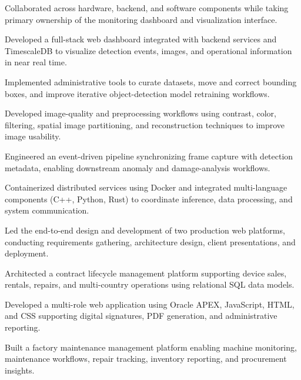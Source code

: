 \documentclass{../../../Styles/MS-Style}
\begin{document}
\begin{Form}
\begin{listBlock}
		\generalItem
		Collaborated across hardware, backend, and software components while taking
		primary ownership of the monitoring dashboard and visualization interface.

		\generalItem
		Developed a full-stack web dashboard integrated with backend services and TimescaleDB
		to visualize detection events, images, and operational information in near real time.

		\generalItem
		Implemented administrative tools to curate datasets, move and correct bounding boxes,
		and improve iterative object-detection model retraining workflows.

		\generalItem
		Developed image-quality and preprocessing workflows using contrast, color, filtering,
		spatial image partitioning, and reconstruction techniques to improve image usability.

		\generalItem
		Engineered an event-driven pipeline synchronizing frame capture with detection metadata,
		enabling downstream anomaly and damage-analysis workflows.

		\generalItem
		Containerized distributed services using Docker and integrated multi-language components
		(C++, Python, Rust) to coordinate inference, data processing, and system communication.

	\end{listBlock}



	\begin{listBlock}

		\generalItem
		Led the end-to-end design and development of two production web platforms,
		conducting requirements gathering, architecture design, client presentations,
		and deployment.\cite{DinantRecommendation}

		\generalItem
		Architected a contract lifecycle management platform supporting device sales,
		rentals, repairs, and multi-country operations using relational SQL data models.

		\generalItem
		Developed a multi-role web application using Oracle APEX, JavaScript, HTML,
		and CSS supporting digital signatures, PDF generation, and administrative reporting.

		\generalItem
		Built a factory maintenance management platform enabling machine monitoring,
		maintenance workflows, repair tracking, inventory reporting, and procurement insights.


\end{listBlock}
\end{Form}
\end{document}
